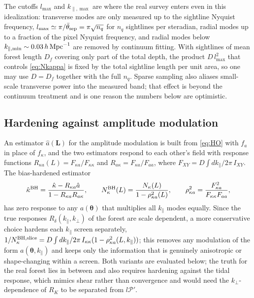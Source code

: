 \documentclass[11pt,a4paper]{article}
\newcommand{\vL}{\bm{L}}
\newcommand{\vth}{\bm{\theta}}
\newcommand{\kpar}{k_\parallel}
\newcommand{\PP}{\mathcal{P}}
\begin{document}
The cutoffs $l_{\max}$ and $k_{\parallel,\max}$ are where the real survey enters even in this idealization: transverse modes are only measured up to the sightline Nyquist frequency, $l_{\max}\simeq\pi/\bar\theta_{\rm sep}=\pi\sqrt{n_q}$ for $n_q$ sightlines per steradian, radial modes up to a fraction of the pixel Nyquist frequency, and radial modes below $k_{\parallel,\min}\sim0.03\,h\,{\rm Mpc}^{-1}$ are removed by continuum fitting. With sightlines of mean forest length $D_f$ covering only part of the total depth, the product $D\,l_{\max}^2$ that controls \eqref{eq:Nkappa} is fixed by the total sightline length per unit area, so one may use $D=D_f$ together with the full $n_q$. Sparse sampling also aliases small-scale transverse power into the measured band; that effect is beyond the continuum treatment and is one reason the numbers below are optimistic.

\subsection{Hardening against amplitude modulation}
\label{sec:hardening}

An estimator $\hat a(\vL)$ for the amplitude modulation is built from \eqref{eq:HO} with $f_a$ in place of $f_\kappa$, and the two estimators respond to each other's field with response functions $R_{\kappa a}(L)=F_{\kappa a}/F_{\kappa\kappa}$ and $R_{a\kappa}=F_{\kappa a}/F_{aa}$, where $F_{XY}=D\int d\kpar/2\pi\,I_{XY}$. The bias-hardened estimator \citep{1209.0091}
\begin{equation}
\hat\kappa^{\rm BH}=\frac{\hat\kappa-R_{\kappa a}\hat a}{1-R_{\kappa a}R_{a\kappa}},\qquad
N^{\rm BH}_\kappa(L)=\frac{N_\kappa(L)}{1-\rho^2_{\kappa a}(L)},\qquad
\rho^2_{\kappa a}=\frac{F_{\kappa a}^2}{F_{\kappa\kappa}F_{aa}},
\label{eq:BH}
\end{equation}
has zero response to any $a(\vth)$ that multiplies all $\kpar$ modes equally. Since the true responses $R_\delta(\kpar,k_\perp)$ of the forest are scale dependent, a more conservative choice hardens each $\kpar$ screen separately, $1/N^{\rm BH,slice}_\kappa=D\int d\kpar/2\pi\,I_{\kappa\kappa}(1-\rho^2_{\kappa a}(L,\kpar))$; this removes any modulation of the form $a(\vth,\kpar)$ and keeps only the information that is genuinely anisotropic or shape-changing within a screen. Both variants are evaluated below; the truth for the real forest lies in between and also requires hardening against the tidal response, which mimics shear rather than convergence and would need the $k_\perp$-dependence of $R_K$ to be separated from $l\PP'$.
\end{document}
